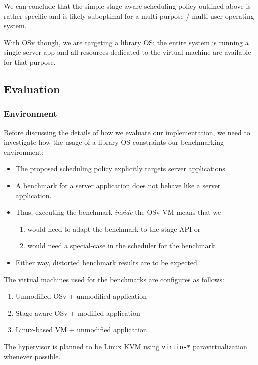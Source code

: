 \documentclass{article}
\begin{document}
We can conclude that the simple stage-aware scheduling policy outlined above is rather specific and
is likely suboptimal for a multi-purpose / multi-user operating system.

With OSv though, we are targeting a library OS:
the entire system is running a single server app and all resources dedicated to the virtual machine are available for that purpose.

\subsection{Evaluation}\label{evaluation}

\subsubsection{Environment}\label{environment}
Before discussing the details of how we evaluate our implementation,
we need to investigate how the usage of a library OS constraints our benchmarking environment:

\begin{itemize}
    \item The proposed scheduling policy explicitly targets server applications.
    \item A benchmark for a server application does not behave like a server application.
    \item Thus, executing the benchmark \emph{inside} the OSv VM means that we
    \begin{enumerate}
        \item would need to adapt the benchmark to the stage API or
        \item would need a special-case in the scheduler for the benchmark.
    \end{enumerate}
    \item Either way, distorted benchmark results are to be expected.
\end{itemize}

The virtual machines used for the benchmarks are configures as follows:
\begin{enumerate}
    \item Unmodified OSv + unmodified application
    \item Stage-aware OSv + modified application
    \item \label{linuxvmsetup} Linux-based VM + unmodified application
\end{enumerate}
The hypervisor is planned to be Linux KVM using \texttt{virtio-*} paravirtualization whenever possible.
\end{document}
